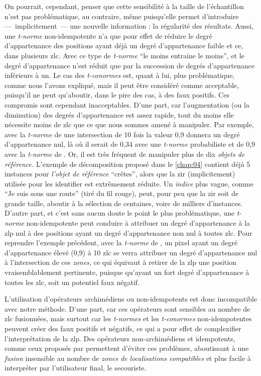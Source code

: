 On pourrait, cependant, penser que cette sensibilité à la taille de
l'échantillon n'est pas problématique, au contraire, même puisqu'elle
permet d'introduire ---~implicitement~--- une nouvelle information :
la régularité des résultats. Aussi, une \emph{t-norme} non-idempotente
n'a que pour effet de réduire le degré d'appartenance des positions
ayant déjà un degré d'appartenance faible et ce, dans plusieurs
\ac{zlc}. Avec ce type de \emph{t-norme} \enquote{le moins entraine le
  moins}, et le degré d'appartenance n'est réduit que par la
succession de degrés d'appartenance inférieurs à un. Le cas des
\emph{t-conormes} est, quant à lui, plus problématique, comme nous
l'avons expliqué, mais il peut être considéré comme acceptable,
puisqu'il ne peut qu'aboutir, dans le pire des cas, à des faux
positifs. Ces compromis sont cependant inacceptables. D'une part, car
l'augmentation (ou la diminution) des degrés d'appartenance est assez
rapide, tout du moins elle nécessite moins de \ac{zlc} que ce que nous
sommes amené à manipuler. Par exemple, avec la \emph{t-norme} de
 une intersection de 10 fois la valeur 0,9 donnera
un degré d’appartenance nul, là où il serait de 0,34 avec une
\emph{t-norme} probabiliste et de 0,9 avec la \emph{t-norme} de
\textcite{Zadeh1965}. Or, il est très fréquent de manipuler plus de
dix \emph{objets de référence.} L'exemple de décomposition proposé
dans le \autoref{chap:04} contient déjà 5 instances pour \emph{l'objet
  de référence} \enquote{crêtes}, alors que la \ac{zir}
(implicitement) utilisée pour les identifier est extrêmement
réduite. Un \emph{indice} plus vague, comme \enquote{Je suis sous une
  route} (tiré du fil rouge), peut, pour peu que la \ac{zir} soit de
grande taille, aboutir à la sélection de centaines, voire de milliers
d'instances. D'autre part, et c'est sans aucun doute le point le plus
problématique, une \emph{t-norme} non-idempotente peut conduire à
attribuer un degré d'appartenance à la \ac{zlp} nul à des positions
ayant un degré d’appartenance non nul à toutes \ac{zlc}. Pour
reprendre l'exemple précédent, avec la \emph{t-norme} de
, un pixel ayant un degré d'appartenance élevé (0,9)
à 10 \ac{zlc} se verra attribuer un degré d'appartenance nul à
l'intersection de ces \emph{zones,} ce qui équivaut à retirer de la
\ac{zlp} une position vraisemblablement pertinente, puisque qu'ayant
un fort degré d’appartenance à toutes les \ac{zlc}, soit un potentiel
faux négatif.

L'utilisation d'opérateurs archimédiens ou non-idempotents est donc
incompatible avec notre méthode. D'une part, car ces opérateurs sont
sensibles au nombre de \ac{zlc} fusionnées, mais surtout car les
\emph{t-normes} et les \emph{t-conormes} non-idempotentes peuvent
créer des faux positifs et négatifs, ce qui a pour effet de
complexifier l'interprétation de la \ac{zlp}. Des opérateurs
non-archimédiens et idempotents, comme ceux proposés par
\textcite{Zadeh1965} permettent d'éviter ces problèmes, aboutissant à
une \emph{fusion} insensible au nombre de \emph{zones de localisations
  compatibles} et plus facile à interpréter par l'utilisateur final,
le secouriste.


